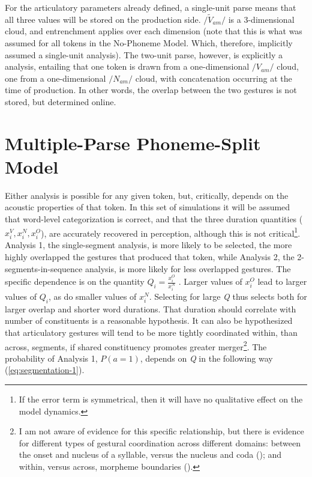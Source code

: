 For the articulatory parameters already defined, a single-unit parse
means that all three values will be stored on the production side.
$/\tilde{V}_{am}/$ is a 3-dimensional cloud, and entrenchment applies
over each dimension (note that this is what was assumed for all tokens
in the No-Phoneme Model. Which, therefore, implicitly assumed a single-unit
analysis). The two-unit parse, however, is explicitly a 
analysis, entailing that one token is drawn from a one-dimensional
\emph{$/V_{am}/$} cloud, one from a one-dimensional \emph{$/N_{am}/$}
cloud, with concatenation occurring at the time of production. In
other words, the overlap between the two gestures is not stored, but
determined online. 

\section{Multiple-Parse Phoneme-Split Model}

Either analysis is possible for any given token, but, critically,
depends on the acoustic properties of that token. In this set of simulations
it will be assumed that word-level categorization is correct, and
that the three duration quantities ($x_{i}^{V},x_{i}^{N},x_{i}^{O}$),
are accurately recovered in perception, although this is not critical\footnote{If the error term is symmetrical, then it will have no qualitative
effect on the model dynamics.}. Analysis 1, the single-segment analysis, is more likely to be selected,
the more highly overlapped the gestures that produced that token,
while Analysis 2, the 2-segments-in-sequence analysis, is more likely
for less overlapped gestures. The specific dependence is on the quantity
$Q_{i}=\frac{x_{i}^{O}}{x_{i}^{N}}$\emph{ }. Larger values of $x_{i}^{O}$
lead to larger values of $Q_{i}$, as do smaller values of $x_{i}^{N}$.
Selecting for large \emph{Q} thus selects both for larger overlap
and shorter word durations. That duration should correlate with number
of constituents is a reasonable hypothesis. It can also be hypothesized
that articulatory gestures will tend to be more tightly coordinated
within, than across, segments, if shared constituency promotes greater
merger\footnote{I am not aware of evidence for this specific relationship, but there
is evidence for different types of gestural coordination across different
domains: between the onset and nucleus of a syllable, versus the nucleus
and coda (\citealt{Browman1988,byrd1996influences}); and within,
versus across, morpheme boundaries (\citealt{Cho2001}).}. The probability of Analysis 1, $P(a=1)$, depends on \emph{Q} in
the following way (\ref{eq:segmentation-1}).

